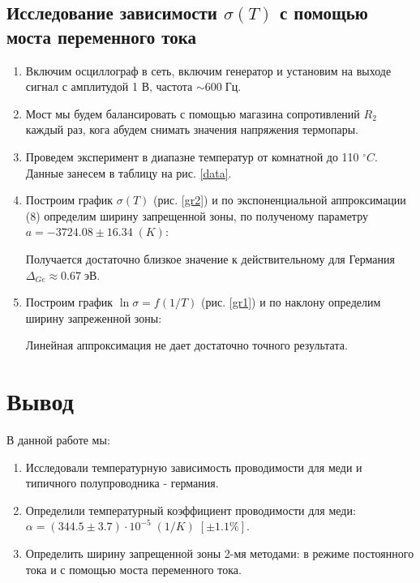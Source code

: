\documentclass[a4paper]{article}
\begin{document}
\subsection{Исследование зависимости $\sigma(T)$ с помощью моста переменного тока}

\begin{enumerate}
    \item Включим осциллограф в сеть, включим генератор и установим на выходе сигнал с амплитудой 1 В, частота $\sim 600\; Гц$.
    \item Мост мы будем балансировать с помощью магазина сопротивлений $R_2$ каждый раз, кога абудем снимать значения напряжения термопары.
    \item Проведем эксперимент в диапазне температур от комнатной до 110 $^{\circ}C$. Данные занесем в таблицу на рис. \ref{data}.
    \item Построим график $\sigma(T)$ (рис. \ref{gr2}) и по экспоненциальной аппроксимации (8) определим ширину запрещенной зоны,  по полученому параметру $a = -3724.08 \pm 16.34 \; (K)$:

        \begin{center}
        \end{center}
        
        Получается достаточно близкое значение к действительному для Германия $\Delta_{Ge} \approx 0.67\; эВ$.
         
    \item Построим график $\ln{\sigma} = f (1/T)$ (рис. \ref{gr1}) и по наклону определим ширину запреженной зоны:

    \begin{center}
    \end{center}

        Линейная аппроксимация не дает достаточно точного результата.

\end{enumerate}


\section{Вывод}
В данной работе мы:
\begin{enumerate}
    \item Исследовали температурную зависимость проводимости для меди и типичного полупроводника - германия.
    \item Определили температурный коэффициент проводимости для меди: $\alpha = (344.5 \pm 3.7) \cdot 10^{-5} \; (1/K)\; [\pm 1.1 \%]$.
    \item Определить ширину запрещенной зоны 2-мя методами: в режиме постоянного тока и с помощью моста переменного тока.
\end{enumerate}
    
\end{document}
